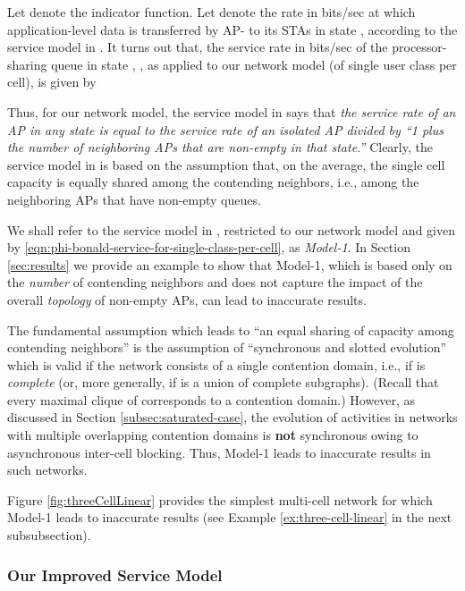 \documentclass[10pt,a4paper,journal]{IEEEtran}
\theoremstyle{definition}
\theoremstyle{remark}
\theoremstyle{plain}
\begin{document}
Let  denote the indicator function. Let  denote the rate in bits/sec at which application-level data is transferred by AP- to its STAs in state , according to the service model in \cite{wanet.bonald08multicellprocsharing}. It turns out that, the service rate  in bits/sec of the  processor-sharing queue in state , , as applied to our network model (of single user class per cell), is given by 


Thus, for our network model, the service model in \cite{wanet.bonald08multicellprocsharing} says that \textit{the service rate of an AP in any state is equal to the service rate of an isolated AP divided by ``1 plus the number of neighboring APs that are non-empty in that state.''} Clearly, the service model in \cite{wanet.bonald08multicellprocsharing} is based on the assumption that, on the average, the single cell capacity is equally shared among the contending neighbors, i.e., among the neighboring APs that have non-empty queues. 

We shall refer to the service model in \cite{wanet.bonald08multicellprocsharing}, restricted to our network model and given by \eqref{eqn:phi-bonald-service-for-single-class-per-cell}, as \textit{Model-1}. In Section \ref{sec:results} we provide an example to show that Model-1, which is based only on the \textit{number} of contending neighbors and does not capture the impact of the overall \textit{topology} of non-empty APs, can lead to inaccurate results.

The fundamental assumption which leads to ``an equal sharing of capacity among contending neighbors'' is the assumption of ``synchronous and slotted evolution'' \cite{wanet.bonald08multicellprocsharing} which is valid if the network consists of a single contention domain, i.e., if  is \textit{complete} (or, more generally, if  is a union of complete subgraphs). (Recall that every maximal clique of  corresponds to a contention domain.) However, as discussed in Section \ref{subsec:saturated-case}, the evolution of activities in networks with multiple overlapping contention domains is \textbf{not} synchronous owing to asynchronous inter-cell blocking. Thus, Model-1 leads to inaccurate results in such networks. 

Figure \ref{fig:threeCellLinear} provides the simplest multi-cell network for which Model-1 leads to inaccurate results (see Example \ref{ex:three-cell-linear} in the next subsubsection). 




\subsubsection{Our Improved Service Model}
\label{subsubsec:our-improved-service-model}
\end{document}
